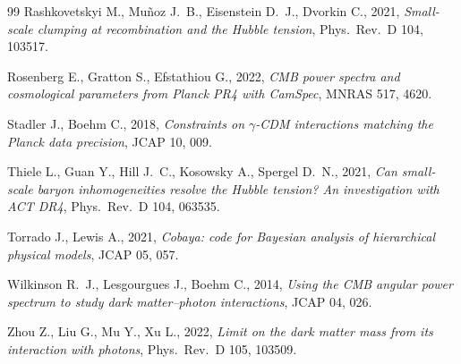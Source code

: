 \documentclass[11pt,a4paper]{article}
\begin{document}
\begin{thebibliography}{99}
Rashkovetskyi M., Mu\~noz J.~B., Eisenstein D.~J., Dvorkin C., 2021, \emph{Small-scale clumping at recombination and the Hubble tension}, Phys.\ Rev.\ D 104, 103517.

Rosenberg E., Gratton S., Efstathiou G., 2022, \emph{CMB power spectra and cosmological parameters from Planck PR4 with CamSpec}, MNRAS 517, 4620.

Stadler J., Boehm C., 2018, \emph{Constraints on $\gamma$-CDM interactions matching the Planck data precision}, JCAP 10, 009.

Thiele L., Guan Y., Hill J.~C., Kosowsky A., Spergel D.~N., 2021, \emph{Can small-scale baryon inhomogeneities resolve the Hubble tension? An investigation with ACT DR4}, Phys.\ Rev.\ D 104, 063535.

Torrado J., Lewis A., 2021, \emph{Cobaya: code for Bayesian analysis of hierarchical physical models}, JCAP 05, 057.

Wilkinson R.~J., Lesgourgues J., Boehm C., 2014, \emph{Using the CMB angular power spectrum to study dark matter--photon interactions}, JCAP 04, 026.

Zhou Z., Liu G., Mu Y., Xu L., 2022, \emph{Limit on the dark matter mass from its interaction with photons}, Phys.\ Rev.\ D 105, 103509.

\end{thebibliography}
\end{document}
